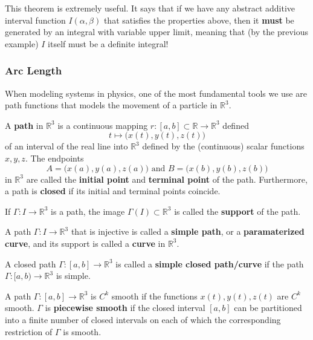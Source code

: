   This theorem is extremely useful. It says that if we have any abstract additive interval function $I(\alpha, \beta)$ that satisfies the properties above, then it \textbf{must} be generated by an integral with variable upper limit, meaning that (by the previous example) $I$ itself must be a definite integral! 

  \subsubsection{Arc Length}
  When modeling systems in physics, one of the most fundamental tools we use are path functions that models the movement of a particle in $\mathbb{R}^3$. 

  \begin{definition}[Path]
    A \textbf{path} in $\mathbb{R}^3$ is a continuous mapping $r: [a, b] \subset \mathbb{R} \longrightarrow \mathbb{R}^3$ defined
    \[t \mapsto \big(x(t), y(t), z(t)\big)\]
    of an interval of the real line into $\mathbb{R}^3$ defined by the (continuous) scalar functions $x, y, z$. The endpoints 
    \[A = \big(x(a), y(a), z(a)\big) \text{ and } B = \big(x(b), y(b), z(b)\big)\]
    in $\mathbb{R}^3$ are called the \textbf{initial point} and \textbf{terminal point} of the path. Furthermore, a path is \textbf{closed} if its initial and terminal points coincide. 
  \end{definition}

  \begin{definition}[Support]
    If $\Gamma: I \longrightarrow \mathbb{R}^3$ is a path, the image $\Gamma(I) \subset \mathbb{R}^3$ is called the \textbf{support} of the path. 
  \end{definition}

  \begin{definition}
    A path $\Gamma: I \longrightarrow \mathbb{R}^3$ that is injective is called a \textbf{simple path}, or a \textbf{paramaterized curve}, and its support is called a \textbf{curve} in $\mathbb{R}^3$. 

    A closed path $\Gamma: [a, b] \longrightarrow \mathbb{R}^3$ is called a \textbf{simple closed path/curve} if the path $\Gamma: [a, b) \longrightarrow \mathbb{R}^3$ is simple. 
  \end{definition}

  \begin{definition}
    A path $\Gamma: [a, b] \longrightarrow \mathbb{R}^3$ is $C^k$ smooth if the functions $x(t), y(t), z(t)$ are $C^k$ smooth. $\Gamma$ is \textbf{piecewise smooth} if the closed interval $[a, b]$ can be partitioned into a finite number of closed intervals on each of which the corresponding restriction of $\Gamma$ is smooth. 
  \end{definition}

